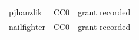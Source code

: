\begin{longtable}{l>{\raggedright\arraybackslash}p{.40\linewidth}l}
pjhanzlik & %
CC0 & %
grant recorded \\ %

nailfighter & %
CC0 & %
grant recorded \\ %

\end{longtable}
\endgroup
\begingroup\small
\setlength{\tabcolsep}{4pt}
